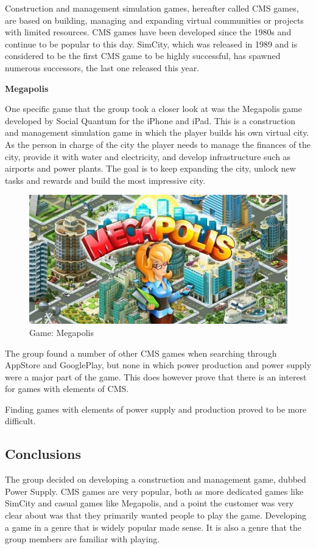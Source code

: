 Construction and management simulation games, hereafter called CMS games, are based on building, managing and expanding virtual communities or projects with limited resources. CMS games have been developed since the 1980s and continue to be popular to this day. SimCity, which was released in 1989 and is considered to be the first CMS game to be highly successful, has spawned numerous successors, the last one released this year. \cite{wikiCMS}

{\bf Megapolis}

One specific game that the group took a closer look at was the Megapolis game developed by Social Quantum for the iPhone and iPad. This is a construction and management simulation game in which the player builds his own virtual city. As the person in charge of the city the player needs to manage the finances of the city, provide it with water and electricity, and develop infrastructure such as airports and power plants. The goal is to keep expanding the city, unlock new tasks and rewards and build the most impressive city. \cite{megapolis}

\begin{figure}[H]
	\centering
	\includegraphics[width=\textwidth]{pictures/megapolis.jpg}
	\caption{Game: Megapolis}
\end{figure}

The group found a number of other CMS games when searching through AppStore and GooglePlay, but none in which power production and power supply were a major part of the game. This does however prove that there is an interest for games
with elements of CMS.

Finding games with elements of power supply and production proved to be more difficult.

\subsection{Conclusions}

The group decided on developing a construction and management game, dubbed Power Supply. CMS games are very popular, both as more dedicated games like SimCity and casual games like Megapolis, and a point the customer was very clear about was that they primarily wanted people to play the game. Developing a game in a genre that is widely popular made sense. It is also a genre that the group members are familiar with playing.
